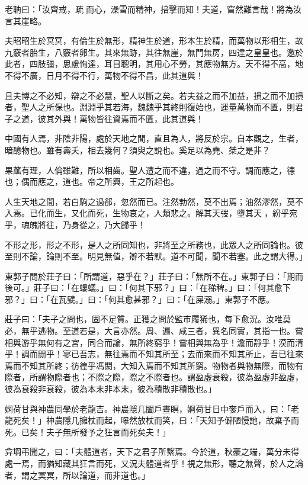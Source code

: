 \begin{pinyinscope}
老聃曰：「汝齊戒，疏𤅢而心，澡雪而精神，掊擊而知！夫道，窅然難言哉！將為汝言其崖略。

夫昭昭生於冥冥，有倫生於無形，精神生於道，形本生於精，而萬物以形相生，故九竅者胎生，八竅者卵生。其來無跡，其往無崖，無門無房，四達之皇皇也。邀於此者，四肢彊，思慮恂達，耳目聰明，其用心不勞，其應物無方。天不得不高，地不得不廣，日月不得不行，萬物不得不昌，此其道與！

且夫博之不必知，辯之不必慧，聖人以斷之矣。若夫益之而不加益，損之而不加損者，聖人之所保也。淵淵乎其若海，魏魏乎其終則復始也，運量萬物而不匱，則君子之道，彼其外與！萬物皆往資焉而不匱，此其道與！

中國有人焉，非陰非陽，處於天地之閒，直且為人，將反於宗。自本觀之，生者，暗醷物也。雖有壽夭，相去幾何？須臾之說也。奚足以為堯、桀之是非？

果蓏有理，人倫雖難，所以相齒。聖人遭之而不違，過之而不守。調而應之，德也；偶而應之，道也。帝之所興，王之所起也。

人生天地之間，若白駒之過郤，忽然而已。注然勃然，莫不出焉；油然漻然，莫不入焉。已化而生，又化而死，生物哀之，人類悲之。解其天弢，墮其天𧙍，紛乎宛乎，魂魄將往，乃身從之，乃大歸乎！

不形之形，形之不形，是人之所同知也，非將至之所務也，此眾人之所同論也。彼至則不論，論則不至。明見無值，辯不若默。道不可聞，聞不若塞。此之謂大得。」

東郭子問於莊子曰：「所謂道，惡乎在？」莊子曰：「無所不在。」東郭子曰：「期而後可。」莊子曰：「在螻蟻。」曰：「何其下邪？」曰：「在稊稗。」曰：「何其愈下邪？」曰：「在瓦甓。」曰：「何其愈甚邪？」曰：「在屎溺。」東郭子不應。

莊子曰：「夫子之問也，固不足質。正獲之問於監市履狶也，每下愈況。汝唯莫必，無乎逃物。至道若是，大言亦然。周、遍、咸三者，異名同實，其指一也。嘗相與游乎無何有之宮，同合而論，無所終窮乎！嘗相與無為乎！澹而靜乎！漠而清乎！調而閒乎！寥已吾志，無往焉而不知其所至；去而來而不知其所止，吾已往來焉而不知其所終；彷徨乎馮閎，大知入焉而不知其所窮。物物者與物無際，而物有際者，所謂物際者也；不際之際，際之不際者也。謂盈虛衰殺，彼為盈虛非盈虛，彼為衰殺非衰殺，彼為本末非本末，彼為積散非積散也。」

婀荷甘與神農同學於老龍吉。神農隱几闔戶晝瞑，婀荷甘日中奓戶而入，曰：「老龍死矣！」神農隱几擁杖而起，嚗然放杖而笑，曰：「天知予僻陋慢訑，故棄予而死。已矣！夫子無所發予之狂言而死矣夫！」

弇堈弔聞之，曰：「夫體道者，天下之君子所繫焉。今於道，秋豪之端，萬分未得處一焉，而猶知藏其狂言而死，又況夫體道者乎！視之無形，聽之無聲，於人之論者，謂之冥冥，所以論道，而非道也。」


\end{pinyinscope}
